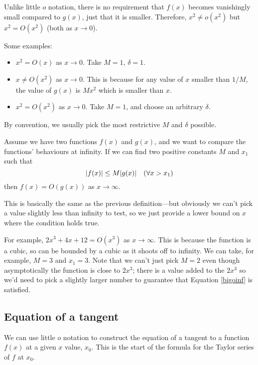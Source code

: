 Unlike little \(o\) notation, there is no requirement that \(f(x)\) becomes vanishingly small compared to \(g(x)\), just that it is smaller.
Therefore, \(x^2 \neq o(x^2)\) but \(x^2 = O(x^2)\) (both as \(x \to 0\)).

Some examples:
\begin{itemize}
	\item \(x^2 = O(x)\) as \(x \to 0\).
	      Take \(M = 1\), \(\delta = 1\).
	\item \(x \neq O(x^2)\) as \(x \to 0\).
	      This is because for any value of \(x\) smaller than \(1/M\), the value of \(g(x)\) is \(Mx^2\) which is smaller than \(x\).
	\item \(x^2 = O(x^2)\) as \(x \to 0\).
	      Take \(M = 1\), and choose an arbitrary \(\delta\).
\end{itemize}

By convention, we usually pick the most restrictive \(M\) and \(\delta\) possible.

\begin{definition}
	Assume we have two functions \(f(x)\) and \(g(x)\), and we want to compare the functions' behaviours at infinity.
	If we can find two positive constants \(M\) and \(x_1\) such that
	\begin{equation}\label{bigoinf}
		\abs{f(x)} \leq M\abs{g(x)} \quad(\forall x > x_1)
	\end{equation}
	then \(f(x) = O(g(x))\) as \(x \to \infty\).
\end{definition}

This is basically the same as the previous definition---but obviously we can't pick a value slightly less than infinity to test, so we just provide a lower bound on \(x\) where the condition holds true.

For example, \(2x^3 + 4x + 12 = O(x^3)\) as \(x \to \infty\).
This is because the function is a cubic, so can be bounded by a cubic as it shoots off to infinity.
We can take, for example, \(M = 3\) and \(x_1 = 3\).
Note that we can't just pick \(M=2\) even though asymptotically the function is close to \(2x^3\); there is a value added to the \(2x^3\) so we'd need to pick a slightly larger number to guarantee that Equation \eqref{bigoinf} is satisfied.

\subsection{Equation of a tangent}
We can use little \(o\) notation to construct the equation of a tangent to a function \(f(x)\) at a given \(x\) value, \(x_0\).
This is the start of the formula for the Taylor series of \(f\) at \(x_0\).

